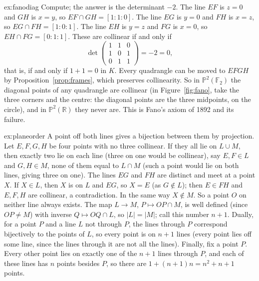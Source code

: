 \begin{solution}{ex:fanodiag}
\idea Compute; the answer is the determinant $-2$.
\writeup The line $EF$ is $z=0$ and $GH$ is $x=y$, so $EF\cap GH=[1:1:0]$. The line $EG$ is $y=0$ and $FH$ is $x=z$, so $EG\cap FH=[1:0:1]$.
The line $EH$ is $y=z$ and $FG$ is $x=0$, so $EH\cap FG=[0:1:1]$. These are collinear if and only if
\[
\det\begin{pmatrix}1&1&0\\1&0&1\\0&1&1\end{pmatrix}=-2=0,
\]
that is, if and only if $1+1=0$ in $K$. Every quadrangle can be moved to $EFGH$ by Proposition~\ref{prop:frames}, which preserves collinearity.
So in $\mathbb P^2(\mathbb F_2)$ the diagonal points of any quadrangle are collinear (in Figure~\ref{fig:fano}, take the three corners and the
centre: the diagonal points are the three midpoints, on the circle), and in $\mathbb P^2(\mathbb R)$ they never are. This is Fano's axiom of
1892 and its failure.
\end{solution}

\begin{solution}{ex:planeorder}
\idea A point off both lines gives a bijection between them by projection.
\writeup Let $E,F,G,H$ be four points with no three collinear. If they all lie on $L\cup M$, then exactly two lie on each line (three on one would be
collinear), say $E,F\in L$ and $G,H\in M$, none of them equal to $L\cap M$ (such a point would lie on both lines, giving three on one). The
lines $EG$ and $FH$ are distinct and meet at a point $X$. If $X\in L$, then $X$ is on $L$ and $EG$, so $X=E$ (as $G\notin L$); then $E\in FH$
and $E,F,H$ are collinear, a contradiction. In the same way $X\notin M$. So a point $O$ on neither line always exists. The map $L\to M$,
$P\mapsto OP\cap M$, is well defined (since $OP\ne M$) with inverse $Q\mapsto OQ\cap L$, so $|L|=|M|$; call this number $n+1$. Dually, for a
point $P$ and a line $L$ not through $P$, the lines through $P$ correspond bijectively to the points of $L$, so every point is on $n+1$ lines
(every point lies off some line, since the lines through it are not all the lines). Finally, fix a point $P$. Every other point lies on exactly
one of the $n+1$ lines through $P$, and each of these lines has $n$ points besides $P$, so there are $1+(n+1)n=n^2+n+1$ points.
\end{solution}

